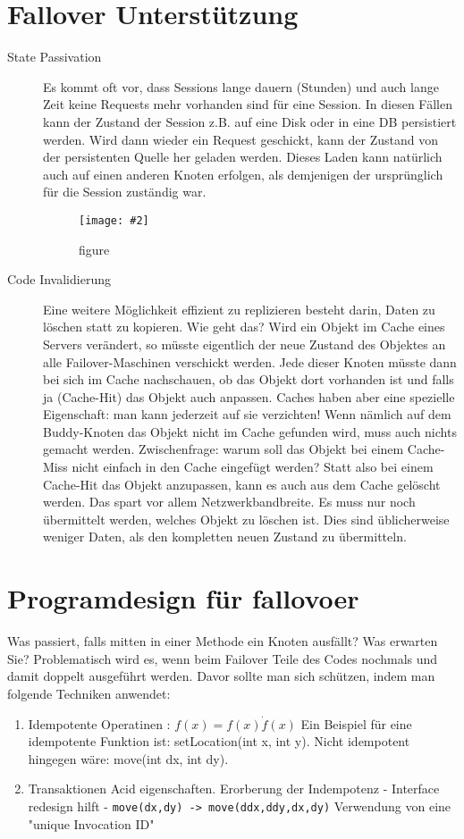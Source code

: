 \documentclass[a4paper,10pt]{scrreprt}
\newcommand{\pic}[2][figure]{\begin{figure}[h]
 \centering
 \texttt{[image: \#2]}
 \caption{#1}
\end{figure}
}
\begin{document}
\section{Fallover Unterstützung} %
\label{sec:fallover_unterst_tzung}
\begin{description}
	\item[State Passivation]Es kommt oft vor, dass Sessions lange dauern (Stunden)
und auch lange Zeit keine Requests mehr vorhanden sind
für eine Session. In diesen Fällen kann der Zustand der
Session z.B. auf eine Disk oder in eine DB persistiert
werden. Wird dann wieder ein Request geschickt, kann der
Zustand von der persistenten Quelle her geladen werden.
Dieses Laden kann natürlich auch auf einen anderen
Knoten erfolgen, als demjenigen der ursprünglich für die
Session zuständig war.
\pic{actpas.png}
\item[Code Invalidierung] Eine weitere Möglichkeit effizient zu replizieren besteht darin, Daten zu löschen statt zu kopieren. Wie geht
das?
Wird ein Objekt im Cache eines Servers verändert, so müsste eigentlich der neue Zustand des Objektes an alle
Failover-Maschinen verschickt werden. Jede dieser Knoten müsste dann bei sich im Cache nachschauen, ob das
Objekt dort vorhanden ist und falls ja (Cache-Hit) das Objekt auch anpassen. Caches haben aber eine spezielle
Eigenschaft: man kann jederzeit auf sie verzichten! Wenn nämlich auf dem Buddy-Knoten das Objekt nicht im
Cache gefunden wird, muss auch nichts gemacht werden. Zwischenfrage: warum soll das Objekt bei einem
Cache-Miss nicht einfach in den Cache eingefügt werden?
Statt also bei einem Cache-Hit das Objekt anzupassen, kann es auch aus dem Cache gelöscht werden. Das spart
vor allem Netzwerkbandbreite. Es muss nur noch übermittelt werden, welches Objekt zu löschen ist. Dies sind
üblicherweise weniger Daten, als den kompletten neuen Zustand zu übermitteln.
 
\end{description}
\section{Programdesign für fallovoer} %
\label{sec:programdesign_f_r_fallovoer}
Was passiert, falls mitten in einer Methode ein Knoten ausfällt? Was erwarten Sie?
Problematisch wird es, wenn beim Failover Teile des Codes nochmals und damit doppelt ausgeführt werden.
Davor sollte man sich schützen, indem man folgende Techniken anwendet:
\begin{enumerate}
	\item Idempotente Operatinen : $f(x) = f(x) \dot f(x)$
	Ein Beispiel für eine idempotente Funktion ist: setLocation(int x, int y). Nicht idempotent
hingegen wäre: move(int dx, int dy).
\item Transaktionen Acid eigenschaften.
Erorberung der Indempotenz - Interface redesign hilft - \texttt{move(dx,dy) -> move(ddx,ddy,dx,dy)}
Verwendung von eine "unique Invocation ID"
\end{enumerate}
\end{document}
